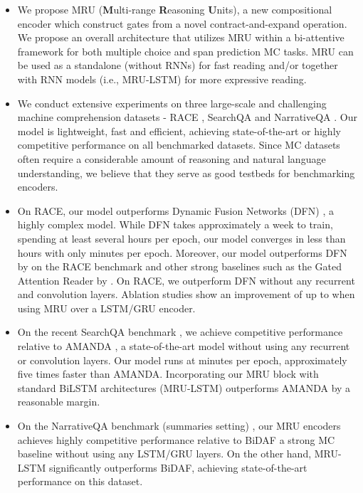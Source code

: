 \documentclass{article}
\begin{document}
\begin{itemize}

\item We propose \textsc{MRU} (\textbf{M}ulti-range \textbf{R}easoning \textbf{U}nits), a new compositional encoder which construct gates from a novel contract-and-expand operation. We propose an overall architecture that utilizes \textsc{MRU} within a bi-attentive framework for both multiple choice and span prediction MC tasks. MRU can be used as a standalone (without RNNs) for fast reading and/or together with RNN models (i.e., MRU-LSTM) for more expressive reading. 
\item We conduct extensive experiments on three large-scale and challenging machine comprehension datasets - RACE \cite{lai2017race}, SearchQA \cite{dunn2017searchqa} and NarrativeQA \cite{kovcisky2017narrativeqa}. Our model is lightweight, fast and efficient, achieving state-of-the-art or highly competitive performance on all benchmarked datasets. Since MC datasets often require a considerable amount of reasoning and natural language understanding, we believe that they serve as good testbeds for benchmarking encoders.
\item  On RACE, our model outperforms Dynamic Fusion Networks (DFN) \cite{xu2017towards}, a highly complex model. While DFN takes approximately a week to train, spending at least several hours per epoch, our model converges in less than  hours with only  minutes per epoch. Moreover, our model outperforms DFN by  on the RACE benchmark and other strong baselines such as the Gated Attention Reader by . On RACE, we outperform DFN without any recurrent and convolution layers. Ablation studies show an improvement of up to  when using MRU over a LSTM/GRU encoder.

\item On the recent SearchQA benchmark \cite{dunn2017searchqa}, we achieve competitive performance relative to AMANDA \cite{kundu2018amanda}, a state-of-the-art model without using any recurrent or convolution layers. Our model runs at  minutes per epoch, approximately five times faster than AMANDA. Incorporating our MRU block with standard BiLSTM architectures (MRU-LSTM) outperforms AMANDA by a reasonable margin.
\item On the NarrativeQA benchmark (summaries setting) \cite{kovcisky2017narrativeqa}, our MRU encoders achieves highly competitive performance relative to BiDAF \cite{seo2016bidirectional} a strong MC baseline without using any LSTM/GRU layers. On the other hand, MRU-LSTM significantly outperforms BiDAF, achieving state-of-the-art performance on this dataset. 
\end{itemize}
\end{document}
